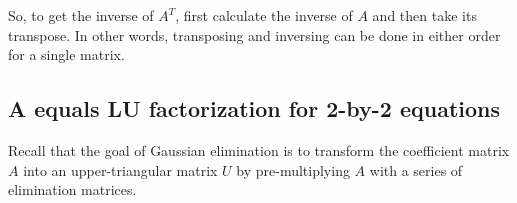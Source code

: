 \documentclass[../main.tex]{subfiles}
\begin{document}
So, to get the inverse of \(A^{T}\), first calculate the inverse of \(A\) and then take its transpose. In other words, transposing and inversing can be done in either order for a single matrix.


\subsection{A equals LU factorization for 2-by-2 equations}
Recall that the  goal of Gaussian elimination is to transform the coefficient matrix \(A\) into an upper-triangular matrix \(U\) by pre-multiplying \(A\) with a series of elimination matrices.
\vspace{0.5em}
\end{document}
